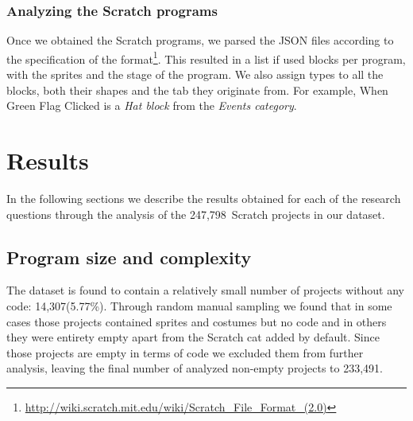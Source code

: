 \documentclass{sig-alternate}
\newcommand{\nAnalyzedPrograms}{247,798}
\newcommand{\nemptyPrograms}{14,307}
\newcommand{\nScriptPrograms}{233,491}
\begin{document}
\subsubsection{Analyzing the Scratch programs}
Once we obtained the Scratch programs, we parsed the JSON files according to the specification of the format\footnote{\url{http://wiki.scratch.mit.edu/wiki/Scratch_File_Format_(2.0)}}. This resulted in a list if used blocks per program, with the sprites and the stage of the program. We also assign types to all the blocks, both their shapes and the tab they originate from. For example, When Green Flag Clicked is a \emph{Hat block} from the \emph{Events category}.


\section{Results}

In the following sections we describe the results obtained for each of the research questions through the analysis of the \nAnalyzedPrograms~Scratch projects in our dataset.

\subsection{Program size and complexity}

The dataset is found to contain a relatively small number of projects without any code: \nemptyPrograms (5.77\%). Through random manual sampling we found that in some cases those projects contained sprites and costumes but no code and in others they were entirety empty apart from the Scratch cat added by default. Since those projects are empty in terms of code we excluded them from further analysis, leaving the final number of analyzed non-empty projects to \nScriptPrograms.
\end{document}
